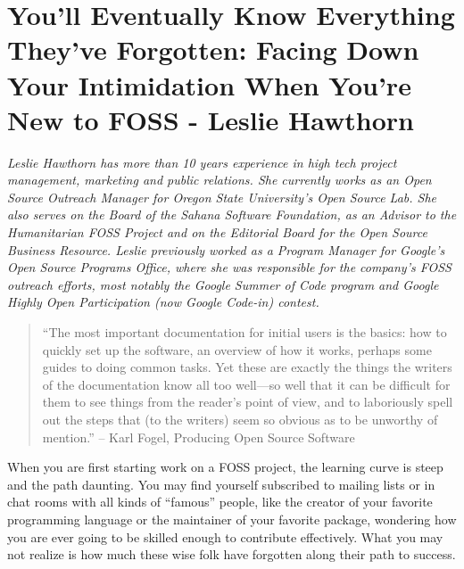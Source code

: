 \chapter{You’ll Eventually Know Everything They’ve Forgotten: Facing Down Your Intimidation When You’re New to FOSS - Leslie Hawthorn}

\textit{Leslie Hawthorn has more than 10 years experience in high tech project management, marketing and public relations. She currently works as an Open Source Outreach Manager for Oregon State University’s Open Source Lab. She also serves on the Board of the Sahana Software Foundation, as an Advisor to the Humanitarian FOSS Project and on the Editorial Board for the Open Source Business Resource. Leslie previously worked as a Program Manager for Google’s Open Source Programs Office, where she was responsible for the company’s FOSS outreach efforts, most notably the Google Summer of Code program and Google Highly Open Participation (now Google Code-in) contest.}

\begin{quote}
``The most important documentation for initial users is the basics: how to quickly set up the software, an overview of how it works, perhaps some guides to doing common tasks. Yet these are exactly the things the writers of the documentation know all too well—so well that it can be difficult for them to see things from the reader's point of view, and to laboriously spell out the steps that (to the writers) seem so obvious as to be unworthy of mention.'' -- Karl Fogel, Producing Open Source Software                                                                                                                                                                                                                                                                                                                                                                                                                                                                                                                       \end{quote}

When you are first starting work on a FOSS project, the learning curve is steep and the path daunting. You may find yourself subscribed to mailing lists or in chat rooms with all kinds of ``famous'' people, like the creator of your favorite programming language or the maintainer of your favorite package, wondering how you are ever going to be skilled enough to contribute effectively. What you may not realize is how much these wise folk have forgotten along their path to success.

